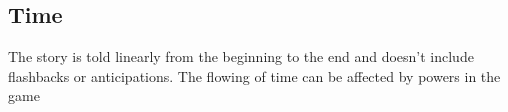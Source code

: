\subsection{Time}
The story is told linearly from the beginning to the end and doesn't include flashbacks or 
anticipations. The flowing of time can be affected by powers in the game
